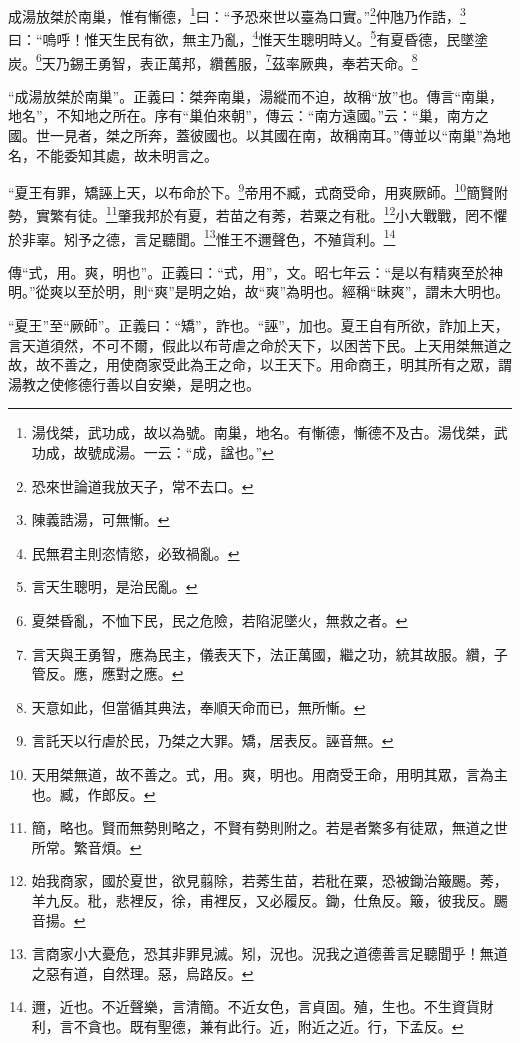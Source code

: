 成湯放桀於南巢，惟有慚德，\footnote{湯伐桀，武功成，故以為號。南巢，地名。有慚德，慚德不及古。湯伐桀，武功成，故號成湯。一云：“成，諡也。”}曰：“予恐來世以臺為口實。”\footnote{恐來世論道我放天子，常不去口。}仲虺乃作誥，\footnote{陳義誥湯，可無慚。}曰：“嗚呼！惟天生民有欲，無主乃亂，\footnote{民無君主則恣情慾，必致禍亂。}惟天生聰明時乂。\footnote{言天生聰明，是治民亂。}有夏昏德，民墜塗炭。\footnote{夏桀昏亂，不恤下民，民之危險，若陷泥墜火，無救之者。}天乃錫王勇智，表正萬邦，纘舊服，\footnote{言天與王勇智，應為民主，儀表天下，法正萬國，繼之功，統其故服。纘，子管反。應，應對之應。}茲率厥典，奉若天命。\footnote{天意如此，但當循其典法，奉順天命而已，無所慚。}

{\noindent\shu{}\fzkt “成湯放桀於南巢”。正義曰：桀奔南巢，湯縱而不迫，故稱“放”也。傳言“南巢，地名”，不知地之所在。序有“巢伯來朝”，傳云：“南方遠國。”云：“巢，南方之國。世一見者，桀之所奔，蓋彼國也。以其國在南，故稱南耳。”傳並以“南巢”為地名，不能委知其處，故未明言之。 \par}

“夏王有罪，矯誣上天，以布命於下。\footnote{言託天以行虐於民，乃桀之大罪。矯，居表反。誣音無。}帝用不臧，式商受命，用爽厥師。\footnote{天用桀無道，故不善之。式，用。爽，明也。用商受王命，用明其眾，言為主也。臧，作郎反。}簡賢附勢，實繁有徒。\footnote{簡，略也。賢而無勢則略之，不賢有勢則附之。若是者繁多有徒眾，無道之世所常。繁音煩。}肇我邦於有夏，若苗之有莠，若粟之有秕。\footnote{始我商家，國於夏世，欲見翦除，若莠生苗，若秕在粟，恐被鋤治簸颺。莠，羊九反。秕，悲裡反，徐，甫裡反，又必履反。鋤，仕魚反。簸，彼我反。颺音揚。}小大戰戰，罔不懼於非辜。矧予之德，言足聽聞。\footnote{言商家小大憂危，恐其非罪見滅。矧，況也。況我之道德善言足聽聞乎！無道之惡有道，自然理。惡，烏路反。}惟王不邇聲色，不殖貨利。\footnote{邇，近也。不近聲樂，言清簡。不近女色，言貞固。殖，生也。不生資貨財利，言不貪也。既有聖德，兼有此行。近，附近之近。行，下孟反。}


{\noindent\zhuan{}\fzbyks 傳“式，用。爽，明也”。正義曰：“式，用”，文。昭七年云：“是以有精爽至於神明。”從爽以至於明，則“爽”是明之始，故“爽”為明也。經稱“昧爽”，謂未大明也。 \par}

{\noindent\shu{}\fzkt “夏王”至“厥師”。正義曰：“矯”，詐也。“誣”，加也。夏王自有所欲，詐加上天，言天道須然，不可不爾，假此以布苛虐之命於天下，以困苦下民。上天用桀無道之故，故不善之，用使商家受此為王之命，以王天下。用命商王，明其所有之眾，謂湯教之使修德行善以自安樂，是明之也。 \par}

